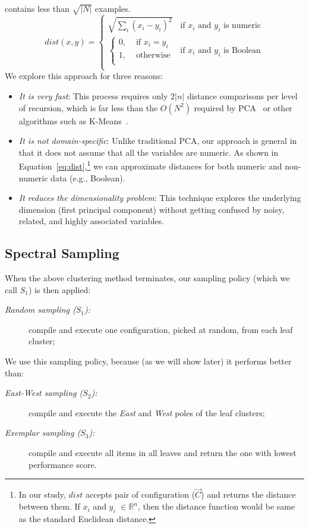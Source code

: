 contains less than  $\sqrt{|N|}$ examples.
\begin{equation}
    \mathit{dist}(x, y) =     
    \begin{cases}
      \sqrt{\sum_i(x_i-y_i)^2}
      & \text{if $x_i$ and $y_i$ is numeric}\\
        \begin{cases}
            0, & \text{ if $x_i = y_i$}\\
            1, & \text{ otherwise}\\
        \end{cases}
        & \text{if $x_i$ and $y_i$ is Boolean}\\
    \end{cases}
    \label{eq:dist}
\end{equation}
We explore this approach for three reasons:
\begin{itemize}
\item
{\em It is very fast}:
This process requires only $2|n|$ distance comparisons
per level of recursion, which is far less than the $O(N^2)$
required by PCA~\cite{Du2008}
or other  algorithms such as K-Means~\cite{hamerly2010making}.
\item
{\em It is not domain-specific}:
Unlike traditional PCA, our approach is general in that it does not assume that all the variables are numeric. As shown in Equation~\ref{eq:dist},\footnote{In our study, $\mathit{dist}$ accepts pair of configuration ($\vec{C}$) and returns the distance between them. If $x_i$ and $y_i$ $\in \mathbb{R}^n$, then the distance function would be same as the standard Euclidean distance.} we can approximate distances for both numeric and non-numeric data (e.g., Boolean).

\item
{\em It reduces the dimensionality problem}:
This technique explores the underlying dimension (first principal component) without getting confused by noisy, related, and highly associated variables.
\end{itemize}

\subsection{Spectral Sampling}\label{sect:sample}
When the above clustering method terminates, our  sampling policy (which we call $S_1$) is then applied:
\begin{description}
\item[{\em Random sampling ($S_1$):}] compile and execute one  configuration,  picked at random, from each leaf cluster;
\end{description}
We use this sampling policy, because (as we will show later) it performs better than:
\begin{description}
\item[{\em East-West sampling ($S_2$):}] compile and execute the {\em East} and {\em West} poles of the leaf clusters;
\item[{\em Exemplar sampling ($S_3$):}] compile and execute all items in all leaves and return the one
with lowest performance score.
\end{description}

